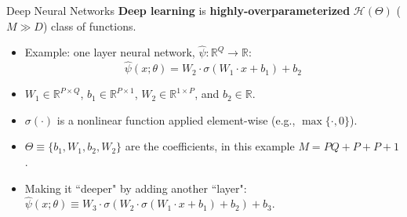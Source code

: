 \documentclass[aspectratio=169,10pt]{beamer}
\newcommand{\emphcolor}[1]{\textbf{\textcolor{emphcolorval}{#1}}}
\begin{document}
\begin{frame}{Deep Neural Networks}
	\emphcolor{Deep learning} is \emphcolor{highly-overparameterized} $\mathcal{H}(\Theta)$ ($M\gg D$) class of functions.
	\begin{itemize}
		
		\item Example: one layer neural network, $\hat{\psi} : \mathbb{R}^Q\rightarrow \mathbb{R}$:
		\begin{equation*}
			\hat{\psi}(x;\theta) = W_2 \cdot \sigma \left(W_1\cdot x+b_1\right)+b_2
		\end{equation*}
		\vspace{0.1in}
		\item $W_1\in \mathbb{R}^{P\times Q}$, $b_1\in \mathbb{R}^{P\times 1}$, $W_2 \in \mathbb{R}^{1\times P}$, and $b_2 \in \mathbb{R}$.
		\vspace{0.1in} 
		\item $\sigma(\cdot)$ is a nonlinear function applied element-wise (e.g., $\max\{\cdot,0\}$).
		\vspace{0.1in}
		\item $\Theta \equiv \{b_1,W_1,b_2,W_2\}$ are the coefficients, in this example $M = PQ+P+P+1$.\vspace{0.1in}
		\item Making it ``deeper" by adding another ``layer":
		$\hat{\psi}(x;\theta)\equiv W_3\cdot\sigma(W_2 \cdot \sigma(W_1 \cdot x + b_1) + b_2)+b_3.$
	\end{itemize}	
\end{frame}
\end{document}
